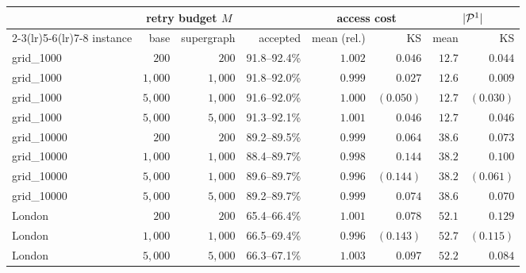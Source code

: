 \begin{tabular}{lrrrrrrr}
\toprule
 & \multicolumn{2}{c}{retry budget $M$} & & \multicolumn{2}{c}{access cost} & \multicolumn{2}{c}{$|\mathcal{P}^1|$} \\
\cmidrule(lr){2-3}\cmidrule(lr){5-6}\cmidrule(lr){7-8}
instance & base & supergraph & accepted & mean (rel.) & KS & mean & KS \\
\midrule
grid\_1000 & $200$ & $200$ & 91.8--92.4\% & $1.002$ & $0.046$ & $12.7$ & $0.044$ \\
grid\_1000 & $1{,}000$ & $1{,}000$ & 91.8--92.0\% & $0.999$ & $0.027$ & $12.6$ & $0.009$ \\
grid\_1000 & $5{,}000$ & $1{,}000$ & 91.6--92.0\% & $1.000$ & $(0.050)$ & $12.7$ & $(0.030)$ \\
grid\_1000 & $5{,}000$ & $5{,}000$ & 91.3--92.1\% & $1.001$ & $0.046$ & $12.7$ & $0.046$ \\
\midrule
grid\_10000 & $200$ & $200$ & 89.2--89.5\% & $0.999$ & $0.064$ & $38.6$ & $0.073$ \\
grid\_10000 & $1{,}000$ & $1{,}000$ & 88.4--89.7\% & $0.998$ & $0.144$ & $38.2$ & $0.100$ \\
grid\_10000 & $5{,}000$ & $1{,}000$ & 89.6--89.7\% & $0.996$ & $(0.144)$ & $38.2$ & $(0.061)$ \\
grid\_10000 & $5{,}000$ & $5{,}000$ & 89.2--89.7\% & $0.999$ & $0.074$ & $38.6$ & $0.070$ \\
\midrule
London & $200$ & $200$ & 65.4--66.4\% & $1.001$ & $0.078$ & $52.1$ & $0.129$ \\
London & $1{,}000$ & $1{,}000$ & 66.5--69.4\% & $0.996$ & $(0.143)$ & $52.7$ & $(0.115)$ \\
London & $5{,}000$ & $5{,}000$ & 66.3--67.1\% & $1.003$ & $0.097$ & $52.2$ & $0.084$ \\
\bottomrule
\end{tabular}

